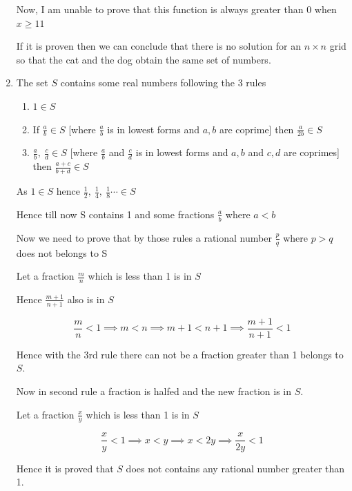 \documentclass{article}
\begin{document}
\begin{enumerate}
Now, I am unable to prove that this function is always greater than 0 when $x\geq 11$

If it is proven then we can conclude that there is no solution for an $n\times n$ grid  so that the cat and the dog obtain the same set of numbers.

\bigskip

\bigskip

\bigskip

\bigskip

\bigskip



\item The set $S$ contains some real numbers following the 3 rules

  \begin{enumerate}
      \item $1\in S$
      \item If $\frac{a}{b}\in S$ [where $\frac{a}{b}$ is in lowest forms and $a,b $ are coprime] then  $\frac{a}{2b} \in S$
      \item $\frac{a}{b}, \ \frac{c}{d} \in S$ [where $\frac{a}{b}$ and $ \frac{c}{d}$ is in lowest forms and $a,b $  and $c,d $ are coprimes] then $\frac{a+c}{b+d}\in S$
   \end{enumerate}
   
As $1\in S$ hence $\frac{1}{2},\ \frac{1}{4},\ \frac{1}{8}\cdots \in S$
   
Hence till now S contains 1 and some fractions $\frac{a}{b}$ where $a< b$

Now we need to prove that by  those rules a rational number $\frac{p}{q}$ where $p>q$ does not belongs to S
   
Let a fraction  $\frac{m}{n}$ which is less than 1  is in $S$

Hence $\frac{m+1}{n+1}$ also is in $S$ 

$$\frac{m}{n}<1 \implies m<n \implies m+1<n+1\implies \frac{m+1}{n+1}<1$$

Hence with the 3rd rule there can not be a fraction greater than 1 belongs to $S$.

Now in second rule a fraction is halfed and the new fraction is in $S$. 
   
Let a fraction  $\frac{x}{y}$ which is less  than 1  is in $S$   

$$\frac{x}{y}<1\implies x<y\implies x<2y\implies \frac{x}{2y}<1$$

Hence  it is proved that $S$ does not contains any rational number greater than 1.


\end{enumerate}
\end{document}
